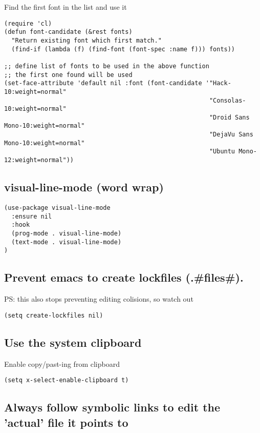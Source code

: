 \documentclass[11pt]{article}
\begin{document}
Find the first font in the list and use it

\begin{verbatim}
(require 'cl)
(defun font-candidate (&rest fonts)
  "Return existing font which first match."
  (find-if (lambda (f) (find-font (font-spec :name f))) fonts))

;; define list of fonts to be used in the above function
;; the first one found will be used
(set-face-attribute 'default nil :font (font-candidate '"Hack-10:weight=normal"
                                                        "Consolas-10:weight=normal"
                                                        "Droid Sans Mono-10:weight=normal"
                                                        "DejaVu Sans Mono-10:weight=normal"
                                                        "Ubuntu Mono-12:weight=normal"))
\end{verbatim}

\subsection*{visual-line-mode (word wrap)}
\label{sec:org004a685}
\begin{verbatim}
(use-package visual-line-mode
  :ensure nil
  :hook
  (prog-mode . visual-line-mode)
  (text-mode . visual-line-mode)
)
\end{verbatim}

\subsection*{Prevent emacs to create lockfiles (.\#files\#).}
\label{sec:org90af75b}

PS: this also stops preventing editing colisions, so watch out
\begin{verbatim}
(setq create-lockfiles nil)
\end{verbatim}

\subsection*{Use the system clipboard}
\label{sec:org75ffd60}

Enable copy/past-ing from clipboard

\begin{verbatim}
(setq x-select-enable-clipboard t)
\end{verbatim}

\subsection*{Always follow symbolic links to edit the 'actual' file it points to}
\label{sec:orgdd11057}
\end{document}
